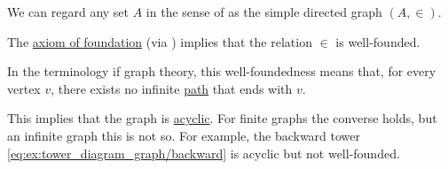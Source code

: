 \begin{remark}\label{rem:well_founded_graphs}
  We can regard any set \( A \) in the sense of \hyperref[def:zfc]{} as the simple directed graph \( (A, \in) \).

  The \hyperref[def:zfc/foundation]{axiom of foundation} (via ) implies that the relation \( \in \) is well-founded.

  In the terminology if graph theory, this well-foundedness means that, for every vertex \( v \), there exists no infinite \hyperref[def:quiver_path]{path} that ends with \( v \).

  This implies that the graph is \hyperref[def:undirected_multigraph_path]{acyclic}. For finite graphs the converse holds, but an infinite graph this is not so. For example, the backward tower \eqref{eq:ex:tower_diagram_graph/backward} is acyclic but not well-founded.
\end{remark}

